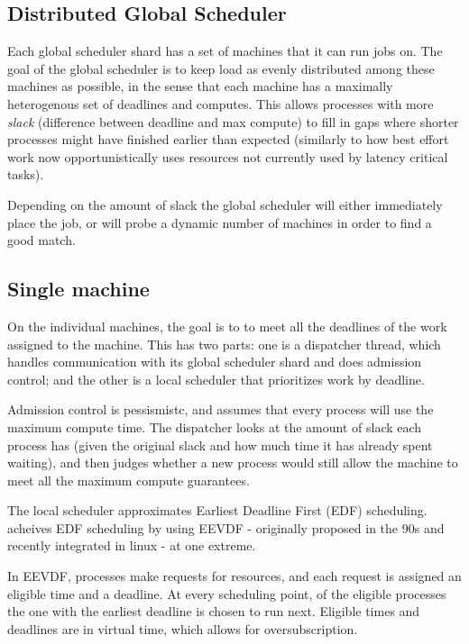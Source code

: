 \subsection*{Distributed Global Scheduler}
\label{DGS}

Each global scheduler shard has a set of machines that it can run jobs on. The
goal of the global scheduler is to keep load as evenly distributed among these
machines as possible, in the sense that each machine has a maximally
heterogenous set of deadlines and computes. This allows processes with more
\textit{slack} (difference between deadline and max compute) to fill in gaps
where shorter processes might have finished earlier than expected (similarly to
how best effort work now opportunistically uses resources not currently used by
latency critical tasks).

Depending on the amount of slack the global scheduler will either immediately
place the job, or will probe a dynamic number of machines in order to find a
good match.


\subsection*{Single machine}
\label{SM}

On the individual machines, the goal is to to meet all the deadlines of the work
assigned to the machine. This has two parts: one is a dispatcher thread, which
handles communication with its global scheduler shard and does admission
control; and the other is a local scheduler that prioritizes work by deadline.

Admission control is pessismistc, and assumes that every process will use the
maximum compute time. The dispatcher looks at the amount of slack each process
has (given the original slack and how much time it has already spent waiting),
and then judges whether a new process would still allow the machine to meet all
the maximum compute guarantees.


The local scheduler approximates Earliest Deadline First (EDF) scheduling.
\sysname{} acheives EDF scheduling by using EEVDF - originally proposed in the 90s
and recently integrated in linux - at one extreme.

In EEVDF, processes make requests for resources, and each request is assigned an
eligible time and a deadline. At every scheduling point, of the eligible
processes the one with the earliest deadline is chosen to run next. Eligible
times and deadlines are in virtual time, which allows for oversubscription. 

